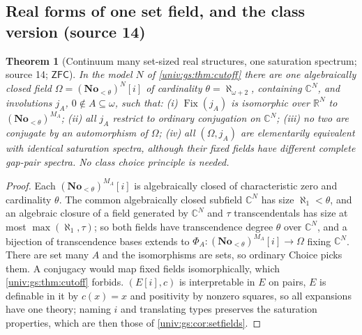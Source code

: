 \documentclass[11pt,letterpaper]{article}
\numberwithin{equation}{section}
\newtheorem{theorem}{Theorem}[section]
\theoremstyle{definition}
\theoremstyle{remark}
\newcommand{\No}{\mathbf{No}}
\newcommand{\R}{\mathbb R}
\newcommand{\C}{\mathbb C}
\newcommand{\Fix}{\operatorname{Fix}}
\newcommand{\ZFC}{\mathsf{ZFC}}
\begin{document}
\subsection{Real forms of one set field, and the class version (source 14)}

\begin{theorem}[Continuum many set-sized real structures, one saturation spectrum; source 14; $\ZFC$]\label{univ:gs:thm:setforms}
In the model $N$ of \cref{univ:gs:thm:cutoff} there are one algebraically closed field
$\Omega=(\No_{<\theta})^N[i]$ of cardinality $\theta=\aleph_{\omega+2}$, containing $\C^N$, and
involutions $j_A$, $0\notin A\subseteq\omega$, such that: (i) $\Fix(j_A)$ is isomorphic over $\R^N$
to $(\No_{<\theta})^{M_A}$; (ii) all $j_A$ restrict to ordinary conjugation on $\C^N$; (iii) no two are
conjugate by an automorphism of $\Omega$; (iv) all $(\Omega,j_A)$ are elementarily equivalent with
identical saturation spectra, although their fixed fields have different complete gap-pair spectra.
No class choice principle is needed.
\end{theorem}
\begin{proof}
Each $(\No_{<\theta})^{M_A}[i]$ is algebraically closed of characteristic zero and cardinality
$\theta$. The common algebraically closed subfield $\C^N$ has size $\aleph_1<\theta$, and an algebraic
closure of a field generated by $\C^N$ and $\tau$ transcendentals has size at most
$\max(\aleph_1,\tau)$; so both fields have transcendence degree $\theta$ over $\C^N$, and a bijection
of transcendence bases extends to $\Phi_A:(\No_{<\theta})^{M_A}[i]\to\Omega$ fixing $\C^N$. There are
set many $A$ and the isomorphisms are sets, so ordinary Choice picks them. A conjugacy would map
fixed fields isomorphically, which \cref{univ:gs:thm:cutoff} forbids. $(E[i],c)$ is interpretable in
$E$ on pairs, $E$ is definable in it by $c(x)=x$ and positivity by nonzero squares, so all expansions
have one theory; naming $i$ and translating types preserves the saturation properties, which are then
those of \cref{univ:gs:cor:setfields}.
\end{proof}
\end{document}
